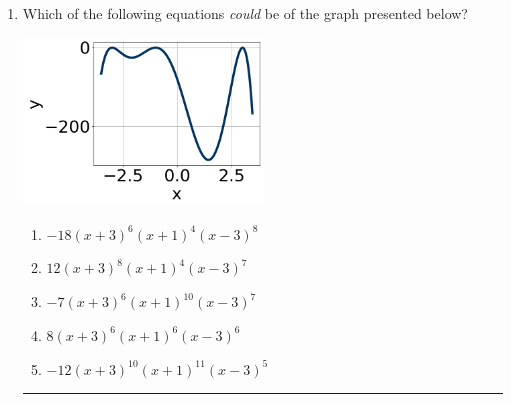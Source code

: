 \documentclass[14pt]{extbook}
\newcommand{\litem}[1]{\item#1\hspace*{-1cm}\rule{\textwidth}{0.4pt}}
\begin{document}
\begin{enumerate}
\litem{
Which of the following equations \textit{could} be of the graph presented below?
\begin{center}
    \includegraphics[width=0.5\textwidth]{../Figures/polyGraphToFunctionA.png}
\end{center}
\begin{enumerate}[label=\Alph*.]
\item \( -18(x + 3)^{6} (x + 1)^{4} (x - 3)^{8} \)
\item \( 12(x + 3)^{8} (x + 1)^{4} (x - 3)^{7} \)
\item \( -7(x + 3)^{6} (x + 1)^{10} (x - 3)^{7} \)
\item \( 8(x + 3)^{6} (x + 1)^{6} (x - 3)^{6} \)
\item \( -12(x + 3)^{10} (x + 1)^{11} (x - 3)^{5} \)


\end{enumerate}}
\end{enumerate}
\end{document}
